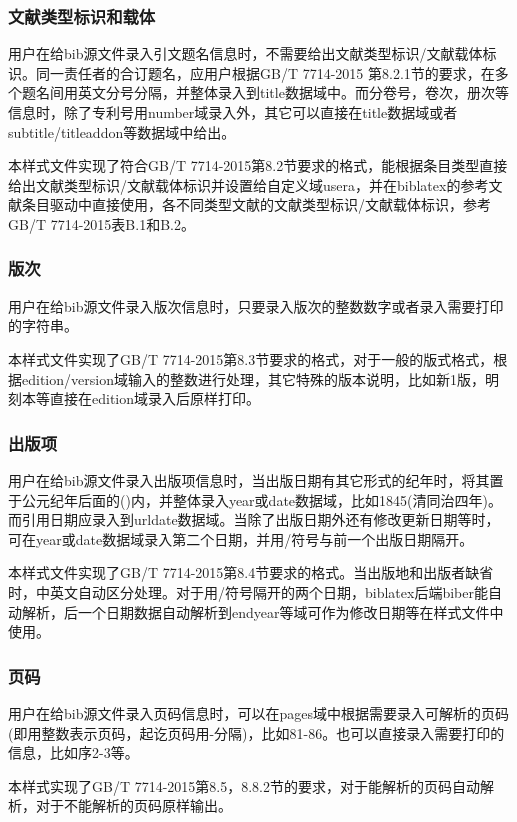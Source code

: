 \subsubsection{文献类型标识和载体}

\begin{property}{}{}
用户在给bib源文件录入引文题名信息时，不需要给出文献类型标识/文献载体标识。同一责任者的合订题名，应用户根据GB/T 7714-2015 第8.2.1节的要求，在多个题名间用英文分号分隔，并整体录入到title数据域中。而分卷号，卷次，册次等信息时，除了专利号用number域录入外，其它可以直接在title数据域或者subtitle/titleaddon等数据域中给出。

本样式文件实现了符合GB/T 7714-2015第8.2节要求的格式，能根据条目类型直接给出文献类型标识/文献载体标识并设置给自定义域usera，并在biblatex的参考文献条目驱动中直接使用，各不同类型文献的文献类型标识/文献载体标识，参考GB/T 7714-2015表B.1和B.2。
\end{property}

\subsubsection{版次}

\begin{property}{}{}
用户在给bib源文件录入版次信息时，只要录入版次的整数数字或者录入需要打印的字符串。

本样式文件实现了GB/T 7714-2015第8.3节要求的格式，对于一般的版式格式，根据edition/version域输入的整数进行处理，其它特殊的版本说明，比如新1版，明刻本等直接在edition域录入后原样打印。
\end{property}

\subsubsection{出版项}

\begin{property}{}{}
用户在给bib源文件录入出版项信息时，当出版日期有其它形式的纪年时，将其置于公元纪年后面的()内，并整体录入year或date数据域，比如1845(清同治四年)。而引用日期应录入到urldate数据域。当除了出版日期外还有修改更新日期等时，可在year或date数据域录入第二个日期，并用/符号与前一个出版日期隔开。

本样式文件实现了GB/T 7714-2015第8.4节要求的格式。当出版地和出版者缺省时，中英文自动区分处理。对于用/符号隔开的两个日期，biblatex后端biber能自动解析，后一个日期数据自动解析到endyear等域可作为修改日期等在样式文件中使用。
\end{property}

\subsubsection{页码}
\begin{property}{}{}
用户在给bib源文件录入页码信息时，可以在pages域中根据需要录入可解析的页码(即用整数表示页码，起讫页码用-分隔)，比如81-86。也可以直接录入需要打印的信息，比如序2-3等。

本样式实现了GB/T 7714-2015第8.5，8.8.2节的要求，对于能解析的页码自动解析，对于不能解析的页码原样输出。
\end{property}


